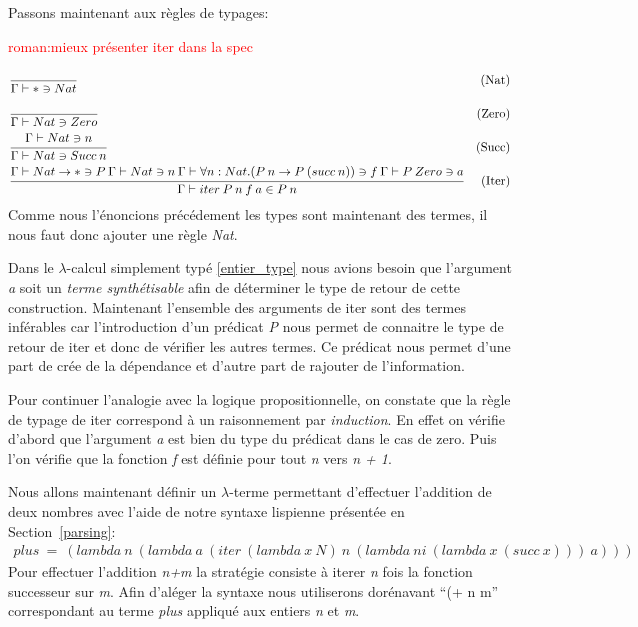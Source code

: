 \documentclass {article}
\theoremstyle{definition}
\theoremstyle{remark}
\newcommand{\todo}[1]{\textcolor{red}{#1}}
\begin{document}
Passons maintenant aux règles de typages:

\todo{roman:mieux présenter iter dans la spec} 
\begin{align*}
  &\cfrac{}
  {\Gamma\vdash * \ni Nat}&\mbox{(Nat)} \\
  &\cfrac{}
  {\Gamma\vdash Nat \ni Zero}&\mbox{(Zero)} \\
  &\cfrac{\Gamma\vdash Nat \ni n}
  {\Gamma\vdash Nat \ni Succ\:n}&\mbox{(Succ)} \\
  &\cfrac{\Gamma\vdash Nat\rightarrow *\ni P\: \Gamma\vdash Nat\ni n\: \Gamma\vdash \forall n:Nat.(P\:n\rightarrow P\:(succ\:n))\ni f\:
  \Gamma\vdash P\:Zero\ni a}
  {\Gamma\vdash iter \: P\: n\:f\:a\in P\:n}&\mbox{(Iter)}\\
\end{align*}
Comme nous l'énoncions précédement les types sont maintenant des termes, il nous faut donc ajouter une règle \emph{Nat}.

Dans le $\lambda$-calcul simplement typé \ref{entier_type} nous avions besoin que l'argument \emph{a} soit un \emph{terme synthétisable}
afin de déterminer le type de retour de cette construction.
Maintenant l'ensemble des arguments de iter sont des termes inférables car l'introduction d'un prédicat
\emph{P} nous permet de connaitre le type de retour de iter et donc de vérifier les autres termes. 
Ce prédicat nous permet d'une part de crée de la dépendance et d'autre part de rajouter de l'information.

Pour continuer l'analogie avec la logique propositionnelle, on constate que la règle de typage de iter correspond à un raisonnement par
\emph{induction}. En effet on vérifie d'abord que l'argument \emph{a} est bien du type du prédicat dans le cas de zero. 
Puis l'on vérifie que la fonction \emph{f} est définie pour tout \emph{n} vers \emph{n + 1}.

Nous allons maintenant définir un $\lambda$-terme permettant d'effectuer l'addition de deux nombres avec l'aide de notre syntaxe
lispienne présentée en Section~\ref{parsing}:
\begin{align*}
  plus\:=\: (lambda\:n\:(lambda\:a\:(iter\:(lambda\:x\:N)\:n\:(lambda\:ni\:(lambda\:x\:(succ\:x)))\:a)))
\end{align*}
Pour effectuer l'addition \emph{n\:+\:m} la stratégie consiste à iterer \emph{n} fois la fonction successeur sur \emph{m}.
Afin d'aléger la syntaxe nous utiliserons dorénavant ``(+ n m'' correspondant au terme \emph{plus} appliqué aux entiers \emph{n} et
\emph{m}.
\end{document}
